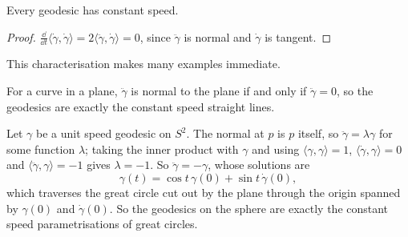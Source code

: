 \documentclass[a4paper]{scrartcl}
\begin{document}
\begin{corollary}
    Every geodesic has constant speed.
\end{corollary}
\begin{proof}
    $\frac{\dd}{\dd t}\langle \dot\gamma,\dot\gamma\rangle = 2\langle \ddot\gamma, \dot\gamma\rangle = 0$, since $\ddot\gamma$ is normal and $\dot\gamma$ is tangent.
\end{proof}

This characterisation makes many examples immediate.

\begin{example}
    For a curve in a plane, $\ddot\gamma$ is normal to the plane if and only if $\ddot\gamma = 0$, so the geodesics are exactly the constant speed straight lines.
\end{example}

\begin{example}
    Let $\gamma$ be a unit speed geodesic on $S^2$. The normal at $p$ is $p$ itself, so $\ddot\gamma = \lambda\gamma$ for some function $\lambda$; taking the inner product with $\gamma$ and using $\langle\gamma,\gamma\rangle = 1$, $\langle\dot\gamma,\gamma\rangle = 0$ and $\langle\ddot\gamma,\gamma\rangle = -1$ gives $\lambda = -1$. So $\ddot\gamma = -\gamma$, whose solutions are
    $$
    \gamma(t) = \cos t\, \gamma(0) + \sin t\, \dot\gamma(0),
    $$
    which traverses the great circle cut out by the plane through the origin spanned by $\gamma(0)$ and $\dot\gamma(0)$. So the geodesics on the sphere are exactly the constant speed parametrisations of great circles.
\end{example}
\end{document}
